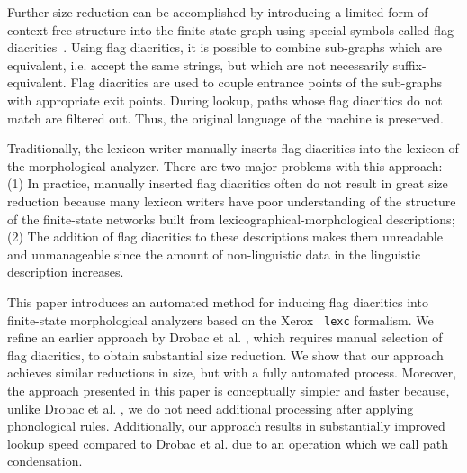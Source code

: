 \documentclass[11pt]{article}
\begin{document}

Further size reduction can be accomplished by introducing a limited
form of context-free structure into the finite-state graph using
special symbols called flag
diacritics~\cite{beesley1998constraining}. Using flag diacritics, it
is possible to combine sub-graphs which are equivalent, i.e. accept
the same strings, but which are not necessarily
suffix-equivalent. Flag diacritics are used to couple entrance points
of the sub-graphs with appropriate exit points. During lookup, paths
whose flag diacritics do not match are filtered out. Thus, the
original language of the machine is preserved.

Traditionally, the lexicon writer manually inserts flag diacritics
into the lexicon of the morphological analyzer. There are two major
problems with this approach: (1) In practice, manually inserted flag
diacritics often do not result in great size reduction because many
lexicon writers have poor understanding of the structure
of the finite-state networks built from lexicographical-morphological
descriptions; (2) The addition of flag diacritics to these
descriptions makes them unreadable and unmanageable since the amount
of non-linguistic data in the linguistic description increases.


This paper introduces an automated method for inducing flag diacritics
into finite-state morphological analyzers based on the Xerox {\tt
  lexc} formalism.  We refine an earlier approach by Drobac et
al. , which requires manual selection of flag
diacritics, to obtain substantial size reduction. We show that
our approach achieves similar reductions in size, but with a fully
automated process. Moreover, the approach presented in this paper is
conceptually simpler and faster because, unlike Drobac et
al. , we do not need additional processing after
applying phonological rules. Additionally, our approach results in
substantially improved lookup speed compared to Drobac et
al.  due to an operation which we call path
condensation.
\end{document}
